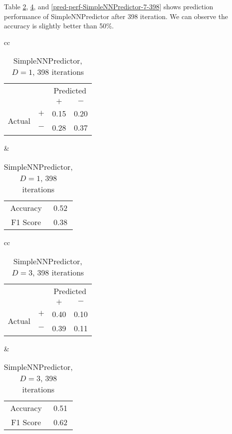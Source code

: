 \documentclass[twocolumn,10pt]{asme2ej}
\begin{document}
Table \ref{pred-perf-SimpleNNPredictor-1-398}, \ref{pred-perf-SimpleNNPredictor-3-398}, and
\ref{pred-perf-SimpleNNPredictor-7-398} shows prediction performance of
SimpleNNPredictor after 398 iteration. We can observe the accuracy is slightly better than 50\%.

\begin{table}
  \begin{tabular}{cc}
    \begin{tabular}{cc|cc}
      & & \multicolumn{2}{c}{Predicted} \\
      & & $+ $ & $-$ \\
      \hline
      \multirow{2}{*}{Actual}
      & $+$ & 0.15 & 0.20 \\
      & $-$ & 0.28 & 0.37 \\
      \hline
    \end{tabular}
    &
    \begin{tabular}{cc}
      Accuracy & 0.52 \\
      F1 Score & 0.38 \\
    \end{tabular}
  \end{tabular}
  \caption{SimpleNNPredictor, $D=1$, 398 iterations}
  \label{pred-perf-SimpleNNPredictor-1-398}
\end{table}


\begin{table}
  \begin{tabular}{cc}
    \begin{tabular}{cc|cc}
      & & \multicolumn{2}{c}{Predicted} \\
      & & $+ $ & $-$ \\
      \hline
      \multirow{2}{*}{Actual}
      & $+$ & 0.40 & 0.10 \\
      & $-$ & 0.39 & 0.11 \\
      \hline
    \end{tabular}
    &
    \begin{tabular}{cc}
      Accuracy & 0.51 \\
      F1 Score & 0.62 \\
    \end{tabular}
  \end{tabular}
  \caption{SimpleNNPredictor, $D=3$, 398 iterations}
  \label{pred-perf-SimpleNNPredictor-3-398}
\end{table}
\end{document}
